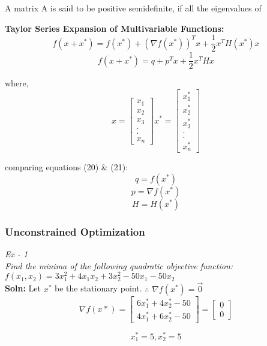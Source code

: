 \documentclass[12pt, letterpaper]{article}
\begin{document}
A matrix A is said to be positive semidefinite, if all the eigenvalues of 

\textbf{Taylor Series Expansion of Multivariable Functions: }
\begin{equation}f(x+x^*) = f(x^*) + (\nabla f(x^*))^T x + \frac{1}{2}x^T H(x^*) x\end{equation}
\begin{equation} f(x+x^*) = q + p^T x + \frac{1}{2}x^T H x\end{equation}

where,
$$x = \begin{bmatrix}x_1 \\ x_2 \\ x_3 \\.\\.\\ x_n \end{bmatrix}
  x^* = \begin{bmatrix}x_1^* \\ x_2^* \\ x_3^* \\.\\.\\ x_n^* \end{bmatrix}$$
  
 comparing equations (20) \& (21): \\
 $$q = f(x^*)$$
 $$p = \nabla f(x^*)$$
 $$H = H(x^*)$$
\subsubsection{Unconstrained Optimization}
\emph{Ex - 1 \\
Find the minima of the following quadratic objective function: \\
    $f(x_1,x_2) = 3x_1^2 + 4x_1x_2 + 3x_2^2 - 50x_1 - 50x_2$ } \\
    
\textbf{Soln: }
Let $x^*$ be the stationary point.
$\therefore$  $\nabla f(x^*) = \overrightarrow 0 $
\begin{equation}
    \nabla f(x*) = \begin{bmatrix}6x_1^* + 4x_2^* - 50 \\ 4x_1^* + 6x_2^* - 50\end{bmatrix} = \begin{bmatrix}
    0 \\ 0
    \end{bmatrix}
\end{equation}

\begin{equation}
  x_1^* = 5 , x_2^* = 5
\end{equation}
\end{document}
